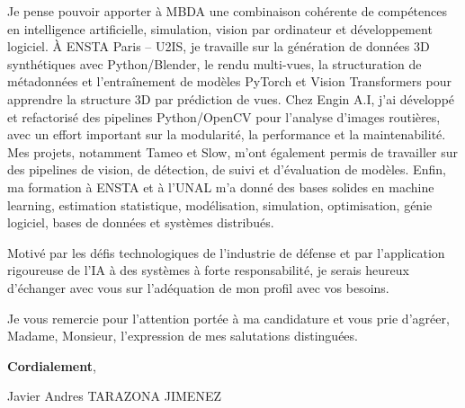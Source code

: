 \documentclass[10pt,a4paper]{article}
\begin{document}
{Je pense pouvoir apporter à MBDA une combinaison cohérente de compétences en intelligence artificielle, simulation, vision par ordinateur et développement logiciel. À ENSTA Paris – U2IS, je travaille sur la génération de données 3D synthétiques avec Python/Blender, le rendu multi-vues, la structuration de métadonnées et l’entraînement de modèles PyTorch et Vision Transformers pour apprendre la structure 3D par prédiction de vues. Chez Engin A.I, j’ai développé et refactorisé des pipelines Python/OpenCV pour l’analyse d’images routières, avec un effort important sur la modularité, la performance et la maintenabilité. Mes projets, notamment Tameo et Slow, m’ont également permis de travailler sur des pipelines de vision, de détection, de suivi et d’évaluation de modèles. Enfin, ma formation à ENSTA et à l’UNAL m’a donné des bases solides en machine learning, estimation statistique, modélisation, simulation, optimisation, génie logiciel, bases de données et systèmes distribués.

Motivé par les défis technologiques de l’industrie de défense et par l’application rigoureuse de l’IA à des systèmes à forte responsabilité, je serais heureux d’échanger avec vous sur l’adéquation de mon profil avec vos besoins.

Je vous remercie pour l’attention portée à ma candidature et vous prie d’agréer, Madame, Monsieur, l’expression de mes salutations distinguées.

\textbf{Cordialement},

Javier Andres TARAZONA JIMENEZ


}
\end{document}
